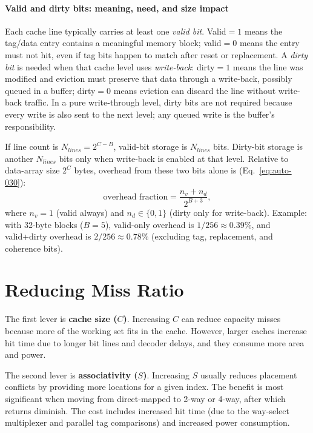\paragraph{Valid and dirty bits: meaning, need, and size impact}\label{par:auto-020}
Each cache line typically carries at least one \textit{valid bit}.
Valid$=1$ means the tag/data entry contains a meaningful memory block; valid$=0$ means the entry must not hit, even if tag bits happen to match after reset or replacement.
A \textit{dirty bit} is needed when that cache level uses \textit{write-back}: dirty$=1$ means the line was modified and eviction must preserve that data through a write-back, possibly queued in a buffer; dirty$=0$ means eviction can discard the line without write-back traffic.
In a pure write-through level, dirty bits are not required because every write is also sent to the next level; any queued write is the buffer's responsibility.

If line count is $N_{lines}=2^{C-B}$, valid-bit storage is $N_{lines}$ bits.
Dirty-bit storage is another $N_{lines}$ bits only when write-back is enabled at that level.
Relative to data-array size $2^C$ bytes, overhead from these two bits alone is (Eq.~\eqref{eq:auto-030}):
\begin{equation}\label{eq:auto-030}
    \text{overhead fraction}=\frac{n_v+n_d}{2^{B+3}},
\end{equation}
where $n_v=1$ (valid always) and $n_d\in\{0,1\}$ (dirty only for write-back).
Example: with 32-byte blocks ($B=5$), valid-only overhead is $1/256\approx0.39\%$, and valid+dirty overhead is $2/256\approx0.78\%$ (excluding tag, replacement, and coherence bits).


\section{Reducing Miss Ratio}\label{sec:auto-028}
The first lever is \textbf{cache size ($C$)}.
Increasing $C$ can reduce capacity misses because more of the working set fits in the cache.
However, larger caches increase hit time due to longer bit lines and decoder delays, and they consume more area and power.

The second lever is \textbf{associativity ($S$)}.
Increasing $S$ usually reduces placement conflicts by providing more locations for a given index.
The benefit is most significant when moving from direct-mapped to 2-way or 4-way, after which returns diminish.
The cost includes increased hit time (due to the way-select multiplexer and parallel tag comparisons) and increased power consumption.

